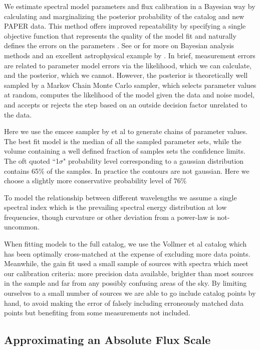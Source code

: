 \documentclass[preprint]{aastex}
\begin{document}
We estimate spectral model parameters and flux calibration in a
Bayesian way by calculating and marginalizing the posterior probability of the
catalog and new PAPER data.   This method
offers improved repeatability by specifying a single objective function that
represents the quality of the model fit and naturally defines the errors on the
parameters \citep{Hogg:2010p8759}.   See  \citet{Mackay:2003p9717}  or
\citet{Sivia:2006p9736} for more on Bayesian analysis methods and an excellent
astrophysical example by \cite{Press:1997p9783}. In brief, measurement errors
are related to parameter model errors via the likelihood, which we can calculate, 
and the posterior, which we cannot.  However, the posterior is theoretically
well sampled by a Markov Chain Monte Carlo sampler, which selects parameter
values at random, computes the likelihood of the model given the data and noise model,
and accepts or rejects the step based on an outside decision factor unrelated to the data.


Here we use the emcee sampler by \citet{Mackay:2003p9717} et al to generate chains of
parameter values. The best fit model is the median of all the sampled
parameter sets, while the volume containing a well defined fraction of samples
sets the confidence limits.  The oft quoted ``1$\sigma$" probability level
corresponding to a gaussian distribution contains 65\% of the samples. In
practice the contours are not gaussian. Here we choose a slightly more
conservative probability level of 76\% 


To model the relationship between different wavelengths we assume a single spectral index
which is the prevailing spectral energy distribution at low frequencies, 
though curvature or other
deviation from a power-law is not-uncommon.  

When fitting models to the full catalog, we use the Vollmer et al
catalog which has been optimally cross-matched at the expense of excluding more data points.
Meanwhile, the gain fit used a small sample of
sources with spectra which meet our calibration criteria: more precision data available,
brighter than most sources in the sample and far from any possibly confusing areas of
the sky. 
By limiting ourselves to a small number of sources we are able to go include catalog points by hand,
to avoid making the error of falsely including erroneously matched 
data points but benefiting from some measurements not included. 


\subsection{Approximating an Absolute Flux Scale}
\label{sec:flux_scale}
\end{document}
